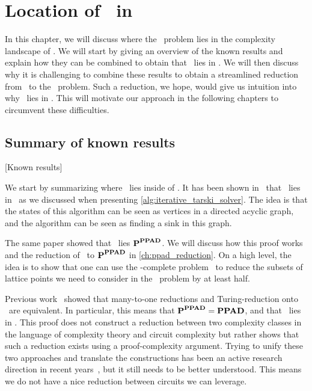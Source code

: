 \setchapterpreamble[u]{\margintoc}
\chapter{Location of \Tarski\ in \TFNP}\label{ch:location_tarski}

In this chapter, we will discuss where the \Tarski\ problem lies in the complexity landscape of \TFNP\@. We will start by giving an overview of the known results and explain how they can be combined to obtain that \Tarski\ lies in \EOPL\@. We will then discuss why it is challenging to combine these results to obtain a streamlined reduction from \Tarski\ to the \EndOfPotentialLine\ problem. Such a reduction, we hope, would give us intuition into why \Tarski\ lies in \EOPL\@. This will motivate our approach in the following chapters to circumvent these difficulties.

\section{Summary of known results}[Known results]

We start by summarizing where \Tarski\ lies inside of \TFNP\@. It has been shown in~\cite{etessami_tarskis_2020} that \Tarski\ lies in \PLS\ as we discussed when presenting \cref{alg:iterative_tarski_solver}. The idea is that the states of this algorithm can be seen as vertices in a directed acyclic graph, and the algorithm can be seen as finding a sink in this graph.

The same paper showed that \Tarski\ lies $\textbf{P}^{\textbf{PPAD}}$. We will discuss how this proof works and the reduction of \Tarski\ to $\textbf{P}^{\textbf{PPAD}}$ in \cref{ch:ppad_reduction}. On a high level, the idea is to show that one can use the \PPAD-complete problem \Brouwer\ to reduce the subsets of lattice points we need to consider in the \Tarski\ problem by at least half.

Previous work~ showed that many-to-one reductions and Turing-reduction onto \PPAD\ are equivalent. In particular, this means that $\textbf{P}^{\textbf{PPAD}} = \textbf{PPAD}$, and that \Tarski\ lies in \PPAD{}. This proof does not construct a reduction between two complexity classes in the language of complexity theory and circuit complexity but rather shows that such a reduction exists using a proof-complexity argument. Trying to unify these two approaches and translate the constructions has been an active research direction in recent years~, but it still needs to be better understood. This means we do not have a nice reduction between circuits we can leverage.

